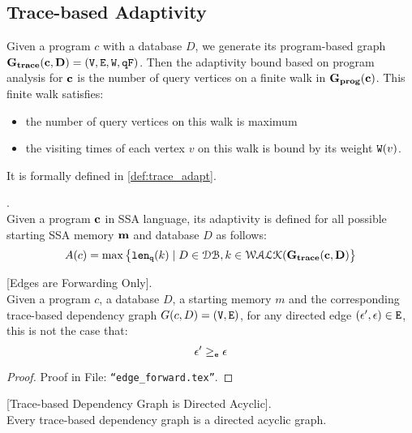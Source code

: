 \subsection{Trace-based Adaptivity}
Given a program $c$ with a database $D$, we generate its program-based graph 
$\bf{G_{trace}}({\boldsymbol{\mathbf{c}}}, D) = (\mathtt{V}, \mathtt{E}, \mathtt{W}, \mathtt{qF})$.
%
Then the adaptivity bound based on program analysis for ${\boldsymbol{\mathbf{c}}}$ is the number of query vertices on a finite walk in $\mathtt{\bf{G_{prog}}}({\boldsymbol{\mathbf{c}}})$. This finite walk satisfies:
%
\begin{itemize}
\item the number of query vertices on this walk is maximum
\item the visiting times of each vertex $v$ on this walk is bound by its weight $\mathtt{W}(v)$.
\end{itemize}
%
It is formally defined in \ref{def:trace_adapt}.
%
\begin{defn}
.
\label{def:trace_adapt}
\\
Given a program ${\boldsymbol{\mathbf{c}}}$ in SSA language, 
its adaptivity is defined for all possible starting SSA memory ${\boldsymbol{\mathbf{m}}}$ and database $D$ as follows:
%
$$
A(c) = \max \big 
\{ \mathtt{len}_{\tt q}(k) \mid D \in \mathcal{DB} , k \in \mathcal{WALK}(\bf{G_{trace}}(c, D) \big \} 
$$
\end{defn}
%
%
%
%
\begin{lem}
\label{lem:edgeforwarding}
[Edges are Forwarding Only].
\\
%
Given a program $c$, a database $D$, a starting memory $m$ and the corresponding trace-based dependency graph $G(c,D) = (\mathtt{V}, \mathtt{E})$, 
for any directed edge $(\mathtt{\epsilon}', \mathtt{\epsilon}) \in \mathtt{E}$, 
this is not the case that:
%
$$\mathtt{\epsilon}' \geq_{\mathtt{e}} \mathtt{\epsilon}$$
%
\end{lem}
%
\begin{proof}
Proof in File: {\tt ``edge\_forward.tex''}.
% 
\end{proof}
%
%
%
\begin{lem}
\label{lem:DAG}
[Trace-based Dependency Graph is Directed Acyclic].
\\
%
{
Every trace-based dependency graph is a directed acyclic graph.
}
\end{lem}
